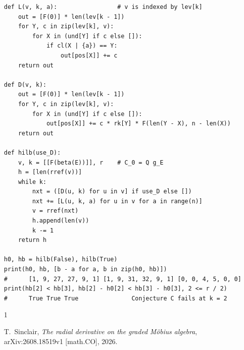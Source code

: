 \documentclass[11pt]{amsart}
\theoremstyle{remark}
\begin{document}
{\begin{verbatim}
def L(v, k, a):                 # v is indexed by lev[k]
    out = [F(0)] * len(lev[k - 1])
    for Y, c in zip(lev[k], v):
        for X in (und[Y] if c else []):
            if cl(X | {a}) == Y:
                out[pos[X]] += c
    return out

def D(v, k):
    out = [F(0)] * len(lev[k - 1])
    for Y, c in zip(lev[k], v):
        for X in (und[Y] if c else []):
            out[pos[X]] += c * rk[Y] * F(len(Y - X), n - len(X))
    return out

def hilb(use_D):
    v, k = [[F(beta(E))]], r    # C_0 = Q g_E
    h = [len(rref(v))]
    while k:
        nxt = ([D(u, k) for u in v] if use_D else [])
        nxt += [L(u, k, a) for u in v for a in range(n)]
        v = rref(nxt)
        h.append(len(v))
        k -= 1
    return h

h0, hb = hilb(False), hilb(True)
print(h0, hb, [b - a for a, b in zip(h0, hb)])
#      [1, 9, 27, 27, 9, 1] [1, 9, 31, 32, 9, 1] [0, 0, 4, 5, 0, 0]
print(hb[2] < hb[3], hb[2] - h0[2] < hb[3] - h0[3], 2 <= r / 2)
#      True True True               Conjecture C fails at k = 2
\end{verbatim}
}

\begin{thebibliography}{1}

T.~Sinclair,
\emph{The radial derivative on the graded M\"obius algebra},
arXiv:2608.18519v1 [math.CO], 2026.

\end{thebibliography}
\end{document}
